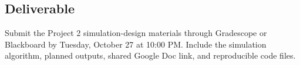 \documentclass{article}
\newcommand{\submissionplatform}{Gradescope or Blackboard}
\newcommand{\duedate}{Tuesday, October 27 at 10:00 PM}
\begin{document}
\subsection*{Deliverable}
Submit the Project 2 simulation-design materials through \submissionplatform{} by \duedate{}. Include the simulation algorithm, planned outputs, shared Google Doc link, and reproducible code files.
\end{document}
